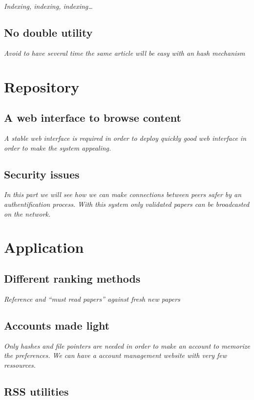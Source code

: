 \textit{Indexing, indexing, indexing\ldots}

\subsection{No double utility}

\textit{Avoid to have several time the same article will
be easy with an hash mechanism}

\section{Repository}

\subsection{A web interface to browse content}

\textit{A stable web interface is required in order to
deploy quickly good web interface in order to make the system
appealing.}

\subsection{Security issues}

\textit{In this part we will see how we can make connections
between peers safer by an authentification process. With this
system only validated papers can be broadcasted on the network.}

\section{Application}

\subsection{Different ranking methods}

\textit{Reference and ``must read papers'' against fresh new papers}

\subsection{Accounts made light}

\textit{Only hashes and file pointers are needed in order to make an
account to memorize the preferences. We can have a account management
website with very few ressources.}

\subsection{RSS utilities}

